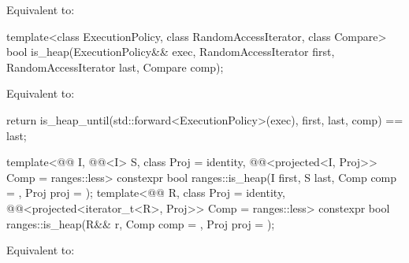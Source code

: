 \begin{itemdescr}
\pnum
\effects
Equivalent to: 
\end{itemdescr}

%
\begin{itemdecl}
template<class ExecutionPolicy, class RandomAccessIterator, class Compare>
  bool is_heap(ExecutionPolicy&& exec,
               RandomAccessIterator first, RandomAccessIterator last,
               Compare comp);
\end{itemdecl}

\begin{itemdescr}
\pnum
\effects
Equivalent to:
\begin{codeblock}
return is_heap_until(std::forward<ExecutionPolicy>(exec), first, last, comp) == last;
\end{codeblock}
\end{itemdescr}

%
\begin{itemdecl}
template<@@ I, @@<I> S, class Proj = identity,
         @@<projected<I, Proj>> Comp = ranges::less>
  constexpr bool ranges::is_heap(I first, S last, Comp comp = {}, Proj proj = {});
template<@@ R, class Proj = identity,
         @@<projected<iterator_t<R>, Proj>> Comp = ranges::less>
  constexpr bool ranges::is_heap(R&& r, Comp comp = {}, Proj proj = {});
\end{itemdecl}

\begin{itemdescr}
\pnum
\effects
Equivalent to:
\end{itemdescr}

